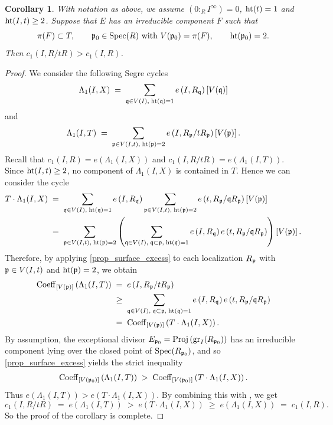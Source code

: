 \documentclass[a4paper, 11pt]{amsart}
\newcommand{\pp}{{\normalfont\mathfrak{p}}}
\newcommand{\qq}{{\mathfrak{q}}}
\newcommand{\HT}{\normalfont\text{ht}}
\newcommand{\gr}{{\normalfont\text{gr}}}
\newcommand{\Proj}{\normalfont\text{Proj}}
\newcommand{\Spec}{\normalfont\text{Spec}}
\newtheorem{corollary}[corollary]{Corollary}
\theoremstyle{definition}
\begin{document}
	\begin{corollary}
		\label{cor_main_c_1}
		With notation as above, we assume $(0:_RI^\infty)=0$, $\HT(t)=1$ and $\HT(I,t) \ge 2$. 
		Suppose that $E$ has an irreducible component $F$ such that
		$$
		\pi(F) \subset T,\qquad \pp_0 \in \Spec(R) \text{ with } V(\pp_0) = \pi(F),\qquad \HT(\pp_0)=2.
		$$
		Then  $c_1(I, R/tR) > c_1(I, R)$.
	\end{corollary}
	\begin{proof}
		We consider the following Segre cycles
		$$
		\Lambda_1(I, X) \;=\; \sum_{\qq\in V(I), \; \HT(\qq)=1}
		e\left(I,R_\qq\right)\left[V(\qq)\right]
		$$
		and 
		$$
		\Lambda_1(I, T)  \;=\; \sum_{\pp\in V(I,t), \; \HT(\pp)=2}
		e\left(I,R_\pp/tR_\pp\right)\left[V(\pp)\right].
		$$
		Recall that $c_1(I, R) = e\left(\Lambda_1(I, X)\right)$ and $c_1(I, R/tR) = e\left(\Lambda_1(I, T)\right)$.
		Since $\HT(I,t) \ge 2$, no component of $\Lambda_1(I, X)$ is contained in $T$.
		Hence we can consider the cycle
		\begin{align*}
			T \cdot \Lambda_1(I, X) &\;=\; \sum_{\qq\in V(I),\; \HT(\qq)=1}
			e\left(I,R_\qq\right) \sum_{\pp\in V(I,t),\; \HT(\pp)=2}
			e\left(t,R_\pp/\qq R_\pp\right)\left[V(\pp)\right] \\
			&\;=\; \sum_{\pp\in V(I,t),\; \HT(\pp)=2}
			\left(
			\sum_{\qq\in V(I),\; \qq\subset \pp,\; \HT(\qq)=1} e\left(I,R_\qq\right)
			e\left(t,R_\pp/\qq R_\pp\right)
			\right)
			\left[V(\pp)\right].
		\end{align*}
		Therefore, by applying \autoref{prop_surface_excess} to each localization $R_\pp$ with $\pp \in V(I,t)$ and $\HT(\pp) = 2$, we obtain
		\begin{align*}
			{\rm Coeff}_{[V(\pp)]}\left(\Lambda_1(I, T)\right) &\;=\; e\left(I,R_\pp/tR_\pp\right)\\ &\;\ge\; \sum_{\qq\in V(I),\; \qq\subset \pp,\; \HT(\qq)=1} e\left(I,R_\qq\right)
			e\left(t,R_\pp/\qq R_\pp\right)\\
			& \;=\; {\rm Coeff}_{[V(\pp)]}\left(T\cdot\Lambda_1(I, X)\right).
		\end{align*}
		By assumption, the exceptional divisor $E_{\pp_0} = \Proj\left(\gr_I(R_{\pp_0})\right)$ has an irreducible component lying over the closed point of $\Spec(R_{\pp_0})$, and so \autoref{prop_surface_excess} yields the strict inequality 
		$$
		{\rm Coeff}_{[V(\pp_0)]}\left(\Lambda_1(I, T)\right) \;>\; {\rm Coeff}_{[V(\pp_0)]}\left(T\cdot\Lambda_1(I, X)\right).
		$$
		Thus $e\left(\Lambda_1(I, T)\right) > e\left(T \cdot \Lambda_1(I, X)\right)$. 
		By combining this with \cite[Corollary 1.2.12]{FOV}, we get
		$$
		c_1(I, R/tR) \;=\; e\left(\Lambda_1(I, T)\right) \;>\; e\left(T \cdot \Lambda_1(I, X)\right) \;\ge\;  e\left(\Lambda_1(I, X)\right) \;=\; c_1(I, R).
		$$
		So the proof of the corollary is complete.
	\end{proof}
	
\end{document}
